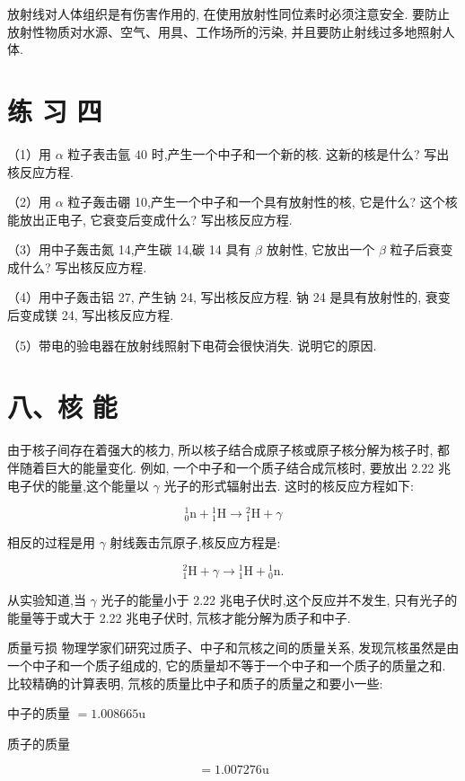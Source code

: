 \documentclass[10pt]{article}
\begin{document}
放射线对人体组织是有伤害作用的, 在使用放射性同位素时必须注意安全. 要防止放射性物质对水源、空气、用具、工作场所的污染, 并且要防止射线过多地照射人体.

\section*{练 习 四}

（1）用 \(\alpha\) 粒子表击氩 \({40}\) 时,产生一个中子和一个新的核. 这新的核是什么? 写出核反应方程.

（2）用 \(\alpha\) 粒子轰击硼 10,产生一个中子和一个具有放射性的核, 它是什么? 这个核能放出正电子, 它衰变后变成什么? 写出核反应方程.

（3）用中子轰击氮 14,产生碳 14,碳 14 具有 \(\beta\) 放射性, 它放出一个 \(\beta\) 粒子后衰变成什么? 写出核反应方程.

（4）用中子轰击铝 27, 产生钠 24, 写出核反应方程. 钠 24 是具有放射性的, 衰变后变成镁 24, 写出核反应方程.

（5）带电的验电器在放射线照射下电荷会很快消失. 说明它的原因.

\section*{八、核 能}

由于核子间存在着强大的核力, 所以核子结合成原子核或原子核分解为核子时, 都伴随着巨大的能量变化. 例如, 一个中子和一个质子结合成氘核时, 要放出 2.22 兆电子伏的能量,这个能量以 \(\gamma\) 光子的形式辐射出去. 这时的核反应方程如下:

\[
{}_{0}^{1}\mathrm{n} + {}_{1}^{1}\mathrm{H} \rightarrow {}_{1}^{2}\mathrm{H} + \gamma
\]

相反的过程是用 \(\gamma\) 射线轰击氘原子,核反应方程是:

\[
{}_{1}^{2}\mathrm{H} + \gamma \rightarrow {}_{1}^{1}\mathrm{H} + {}_{0}^{1}\mathrm{n}\text{.}
\]

从实验知道,当 \(\gamma\) 光子的能量小于 2.22 兆电子伏时,这个反应并不发生, 只有光子的能量等于或大于 2.22 兆电子伏时, 氘核才能分解为质子和中子.

质量亏损 物理学家们研究过质子、中子和氘核之间的质量关系, 发现氘核虽然是由一个中子和一个质子组成的, 它的质量却不等于一个中子和一个质子的质量之和. 比较精确的计算表明, 氘核的质量比中子和质子的质量之和要小一些:

中子的质量 \(= {1.008665}\mathrm{u}\)

质子的质量

\[
= {1.007276}\mathrm{u}
\]
\end{document}

